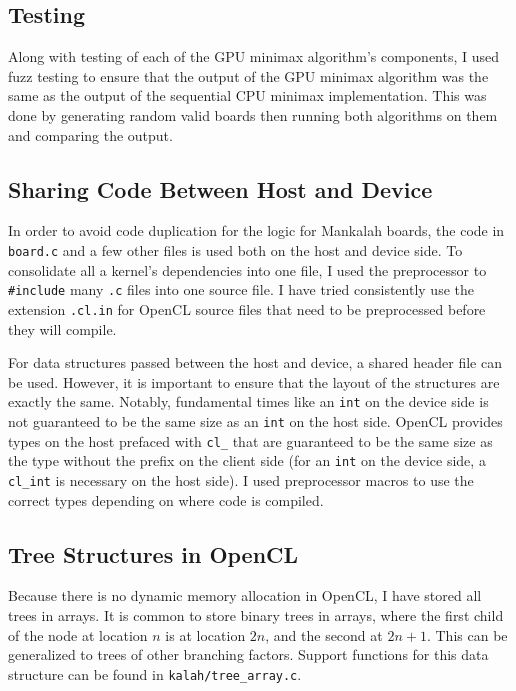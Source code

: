 \documentclass{article}
\begin{document}
\subsection{Testing}
Along with testing of each of the GPU minimax algorithm's components, I used fuzz testing to ensure that the output of the GPU minimax algorithm was the same as the output of the sequential CPU minimax implementation. This was done by generating random valid boards then running both algorithms on them and comparing the output.

\subsection{Sharing Code Between Host and Device}
In order to avoid code duplication for the logic for Mankalah boards, the code in \texttt{board.c} and a few other files is used both on the host and device side. To consolidate all a kernel's dependencies into one file, I used the preprocessor to \texttt{\#include} many \texttt{.c} files into one source file. I have tried consistently use the extension \texttt{.cl.in} for OpenCL source files that need to be preprocessed before they will compile.

For data structures passed between the host and device, a shared header file can be used. However, it is important to ensure that the layout of the structures are exactly the same. Notably, fundamental times like an \texttt{int} on the device side is not guaranteed to be the same size as an \texttt{int} on the host side. OpenCL provides types on the host prefaced with \texttt{cl\_} that are guaranteed to be the same size as the type without the prefix on the client side (for an \texttt{int} on the device side, a \texttt{cl\_int} is necessary on the host side). I used preprocessor macros to use the correct types depending on where code is compiled.

\subsection{Tree Structures in OpenCL}
Because there is no dynamic memory allocation in OpenCL, I have stored all trees in arrays. It is common to store binary trees in arrays, where the first child of the node at location $n$ is at location $2n$, and the second at $2n + 1$. This can be generalized to trees of other branching factors. Support functions for this data structure can be found in \texttt{kalah/tree\_array.c}.

\end{document}
